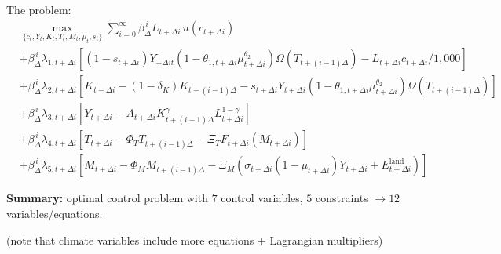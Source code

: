 \documentclass[xcolor=x11names,compress,aspectratio=169]{beamer}%
\begin{document}
\begin{frame}%


The \cite{ramsey1927contribution} problem:%
\begin{align*}
&  \max_{\{c_{t},Y_{t},K_{t},T_{t},M_{t},\mu_{t},s_{t}\}}\sum_{i=0}^{\infty
}\beta_{\Delta}^{\,i}L_{t+\Delta i}\,u(c_{t+\Delta i})\\
&  +\beta_{\Delta}^{\,i}\lambda_{1,t+\Delta i}\left[  \left(  1-s_{t+\Delta
i}\right)  Y_{+\Delta it}\left(  1-\theta_{1,t+\Delta i}\mu_{t+\Delta
i}^{\theta_{2}}\right)  \Omega\left(  T_{t+\left(  i-1\right)  \Delta}\right)
-L_{t+\Delta i}c_{t+\Delta i}/1,000\right]  \\
&  +\beta_{\Delta}^{\,i}\lambda_{2,t+\Delta i}\left[  K_{t+\Delta i}-\left(
1-\delta_{K}\right)  K_{t+\left(  i-1\right)  \Delta}-s_{t+\Delta
i}Y_{t+\Delta i}\left(  1-\theta_{1,t+\Delta i}\mu_{t+\Delta i}^{\theta_{2}%
}\right)  \Omega\left(  T_{t+\left(  i-1\right)  \Delta}\right)  \right]  \\
&  +\beta_{\Delta}^{\,i}\lambda_{3,t+\Delta i}\left[  Y_{t+\Delta
i}-A_{t+\Delta i}K_{t+\left(  i-1\right)  \Delta}^{\gamma}L_{t+\Delta
i}^{1-\gamma}\right]  \\
&  +\beta_{\Delta}^{\,i}\lambda_{4,t+\Delta i}\left[  T_{t+\Delta i}-\Phi
_{T}T_{t+\left(  i-1\right)  \Delta}-\Xi_{T}F_{t+\Delta i}\left(  M_{t+\Delta
i}\right)  \right]  \\
&  +\beta_{\Delta}^{\,i}\lambda_{5,t+\Delta i}\left[  M_{t+\Delta i}-\Phi
_{M}M_{t+\left(  i-1\right)  \Delta}-\Xi_{M}\left(  \sigma_{t+\Delta i}\left(
1-\mu_{t+\Delta i}\right)  Y_{t+\Delta i}+E_{t+\Delta i}^{\text{land}}\right)
\right]
\end{align*}


\textbf{Summary:} optimal control problem with $7$ control variables, $5$
constraints $\rightarrow12$ variables/equations.

(note that climate variables include more equations + Lagrangian multipliers)%

\transboxout
\end{frame}%
%
\end{document}

